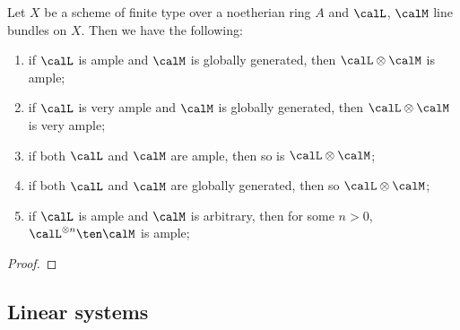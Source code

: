     \begin{proposition}\label{prop:tensor_with_ample_very_ample_and_bpf}
        Let \(X\) be a scheme of finite type over a noetherian ring \(A\) and \(\calL\), \(\calM\) line bundles on \(X\).
        Then we have the following:
        \begin{enumerate}
            \item if \(\calL\) is ample and \(\calM\) is globally generated, then \(\calL \otimes \calM\) is ample;
            \item if \(\calL\) is very ample and \(\calM\) is globally generated, then \(\calL \otimes \calM\) is very ample;
            \item if both \(\calL\) and \(\calM\) are ample, then so is \(\calL \otimes \calM\);
            \item if both \(\calL\) and \(\calM\) are globally generated, then so \(\calL \otimes \calM\);
            \item if \(\calL\) is ample and \(\calM\) is arbitrary, then for some \(n>0\), \(\calL^{\otimes n} \ten \calM\) is ample;
        \end{enumerate}
    \end{proposition}
    \begin{proof}
    \end{proof}

    

\subsection{Linear systems}

